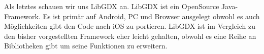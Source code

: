 Als letztes schauen wir uns LibGDX an. LibGDX ist ein OpenSource Java-Framework. Es ist primär auf Android, PC und Browser ausgelegt obwohl es auch Möglichkeiten gibt den Code nach iOS zu portieren. LibGDX ist im Vergleich zu den bisher vorgestellten Framework eher leicht gehalten, obwohl es eine Reihe an Bibliotheken gibt um seine Funktionen zu erweitern.